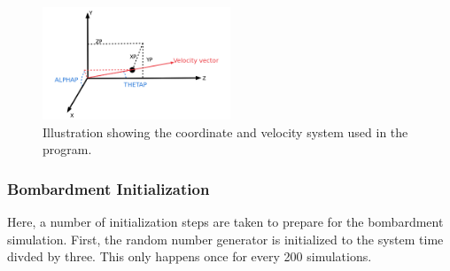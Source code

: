 \documentclass[10pt, reqno]{exam}
\begin{document}
\begin{figure}[h]
    \centering
    \includegraphics[width = 0.5\textwidth]{figures/coordinate_system_explanation.png}
    \caption{Illustration showing the coordinate and velocity system used in the program.}
    \label{fig:coordinate system}
\end{figure}

\subsubsection{Bombardment Initialization}
\label{sec:bombardment initialization}

Here, a number of initialization steps are taken to prepare for the bombardment simulation. First, the random number generator is initialized to the system time divded by three. This only happens once for every 200 simulations. \par
\end{document}
